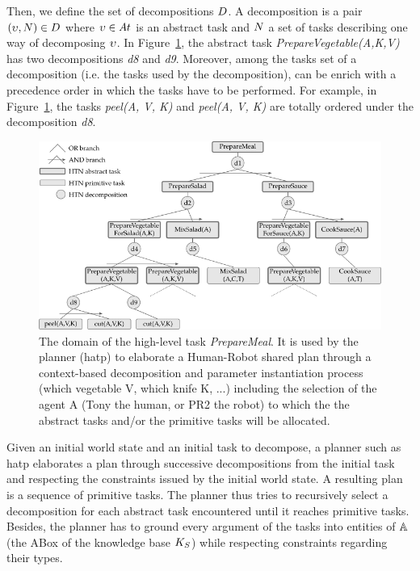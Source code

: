Then, we define the set of decompositions $D$. A decomposition is a pair $(\upsilon, N) \in D$ where $\upsilon \in At$ is an abstract task and $N$ a set of tasks describing one way of decomposing $\upsilon$. In Figure~\ref{fig:chap6_domain}, the abstract task \textit{PrepareVegetable(A,K,V)} has two decompositions \textit{d8} and \textit{d9}. Moreover, among the tasks set of a decomposition (i.e. the tasks used by the decomposition), can be enrich with a precedence order in which the tasks have to be performed. For example, in Figure~\ref{fig:chap6_domain}, the tasks \textit{peel(A, V, K)} and \textit{peel(A, V, K)} are totally ordered under the decomposition \textit{d8}. 

\begin{figure}[ht!]
\centering
\includegraphics[width=\textwidth]{figures/chapter6/domain.png}
\caption{\label{fig:chap6_domain} The  domain of the high-level task \textit{PrepareMeal}. It is used by the planner (\acrshort{hatp}) to elaborate a Human-Robot shared plan through a context-based decomposition and parameter instantiation process (which vegetable V, which knife K, ...) including the selection of the agent A (Tony the human, or PR2 the robot) to which the the abstract tasks and/or the primitive tasks will be allocated.}
\end{figure}

Given an initial world state and an initial task to decompose, a planner such as \acrshort{hatp} elaborates a plan through successive decompositions from the initial task and respecting the constraints issued by the initial world state. A resulting plan is a sequence of primitive tasks. The planner thus tries to recursively select a decomposition for each abstract task encountered until it reaches primitive tasks. Besides, the planner has to ground every argument of the tasks into entities of $\mathbb{A}$ (the ABox of the knowledge base $K_S$) while respecting constraints regarding their types.

